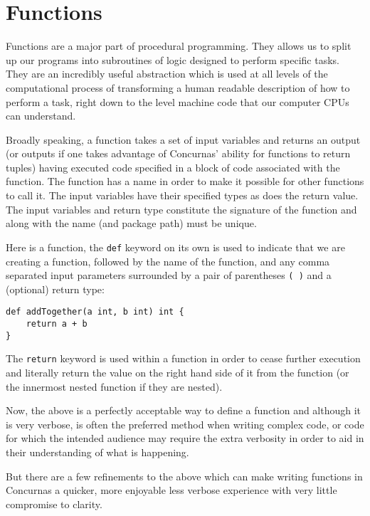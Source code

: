 \documentclass[conc-doc]{subfiles}
\begin{document}
	
	\chapter[Functions]{Functions}
	
Functions are a major part of procedural programming. They allows us to split up our programs into subroutines of logic designed to perform specific tasks. They are an incredibly useful abstraction which is used at all levels of the computational process of transforming a human readable description of how to perform a task, right down to the level machine code that our computer CPUs can understand.

Broadly speaking, a function takes a set of input variables and returns an output (or outputs if one takes advantage of Concurnas' ability for functions to return tuples) having executed code specified in a block of code associated with the function. The function has a name in order to make it possible for other functions to call it. The input variables have their specified types as does the return value. The input variables and return type constitute the signature of the function and along with the name (and package path) must be unique.

Here is a function, the \lstinline{def} keyword on its own is used to indicate that we are creating a function, followed by the name of the function, and any comma separated input parameters surrounded by a pair of parentheses \lstinline{( )} and a (optional) return type:

\begin{lstlisting}
def addTogether(a int, b int) int {
	return a + b
}
\end{lstlisting}

The \lstinline{return} keyword is used within a function in order to cease further execution and literally return the value on the right hand side of it from the function (or the innermost nested function if they are nested).

Now, the above is a perfectly acceptable way to define a function and although it is very verbose, is often the preferred method when writing complex code, or code for which the intended audience may require the extra verbosity in order to aid in their understanding of what is happening.

But there are a few refinements to the above which can make writing functions in Concurnas a quicker, more enjoyable less verbose experience with very little compromise to clarity.
\end{document}
